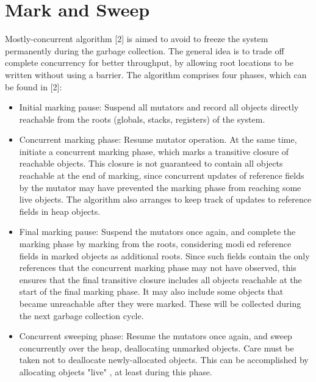 \documentclass[a4paper, 14pt]{article}
\begin{document}
\section{Mark and Sweep}
Mostly-concurrent algorithm [2] is aimed to avoid to freeze the system permanently during the garbage collection. The general idea is to trade off complete concurrency for better throughput, by allowing root locations to be written without using a barrier. The algorithm comprises four phases, which can be found in [2]: \\
\begin{itemize}
\item Initial marking pause: Suspend all mutators and record all objects directly reachable from the roots (globals, stacks, registers) of the system.
\item Concurrent marking phase: Resume mutator operation. At the same time, initiate a concurrent marking phase, which marks a transitive closure of reachable objects. This closure is not guaranteed to contain all objects reachable at the end of marking, since concurrent updates of reference fields by the mutator may have prevented the marking phase from reaching some live objects. The algorithm also arranges to keep track of updates to reference fields in heap objects.
\item Final marking pause: Suspend the mutators once again, and complete the marking phase by marking from the roots, considering modied reference fields in marked objects as additional roots. Since such fields contain the only references that the concurrent marking phase may not have observed, this ensures that the final transitive closure includes all objects reachable at the start of the final marking phase. It may also include some objects that became unreachable after they were marked. These will be collected during the next garbage collection cycle.
\item Concurrent sweeping phase: Resume the mutators once again, and sweep concurrently over the heap, deallocating unmarked objects. Care must be taken not to deallocate newly-allocated objects. This can be accomplished by allocating objects "live" , at least during this phase.
\end{itemize}
\newpage

{}
\end{document}
